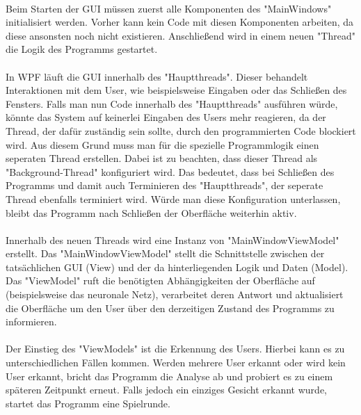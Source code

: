 \documentclass[12pt,a4paper,headinclude,twoside, plainheadsepline, open=right,numbers=noenddot]{scrreprt}
\begin{document}
\paragraph{}
Beim Starten der GUI müssen zuerst alle Komponenten des "{}MainWindows"{} initialisiert werden. Vorher kann kein Code mit diesen Komponenten arbeiten, da diese ansonsten noch nicht existieren. Anschließend wird in einem neuen "{}Thread"{} die Logik des Programms gestartet.
\paragraph{}
In WPF läuft die GUI innerhalb des "{}Hauptthreads"{}. Dieser behandelt Interaktionen mit dem User, wie beispielsweise Eingaben oder das Schließen des Fensters. Falls man nun Code innerhalb des "{}Hauptthreads"{} ausführen würde, könnte das System auf keinerlei Eingaben des Users mehr reagieren, da der Thread, der dafür zuständig sein sollte, durch den programmierten Code blockiert wird. Aus diesem Grund muss man für die spezielle Programmlogik einen seperaten Thread erstellen. Dabei ist zu beachten, dass dieser Thread als "{}Background-Thread"{} konfiguriert wird. Das bedeutet, dass bei Schließen des Programms und damit auch Terminieren des "{}Hauptthreads"{}, der seperate Thread ebenfalls terminiert wird. Würde man diese Konfiguration unterlassen, bleibt das Programm nach Schließen der Oberfläche weiterhin aktiv.
\paragraph{}
Innerhalb des neuen Threads wird eine Instanz von "{}MainWindowViewModel"{} erstellt. Das "{}MainWindowViewModel"{} stellt die Schnittstelle zwischen der tatsächlichen GUI (View) und der da hinterliegenden Logik und Daten (Model). Das "{}ViewModel"{} ruft die benötigten Abhängigkeiten der Oberfläche auf (beispielsweise das neuronale Netz), verarbeitet deren Antwort und aktualisiert die Oberfläche um den User über den derzeitigen Zustand des Programms zu informieren. 
\paragraph{}
Der Einstieg des "{}ViewModels"{} ist die Erkennung des Users. Hierbei kann es zu unterschiedlichen Fällen kommen. Werden mehrere User erkannt oder wird kein User erkannt, bricht das Programm die Analyse ab und probiert es zu einem späteren Zeitpunkt erneut. Falls jedoch ein einziges Gesicht erkannt wurde, startet das Programm eine Spielrunde.
\end{document}
